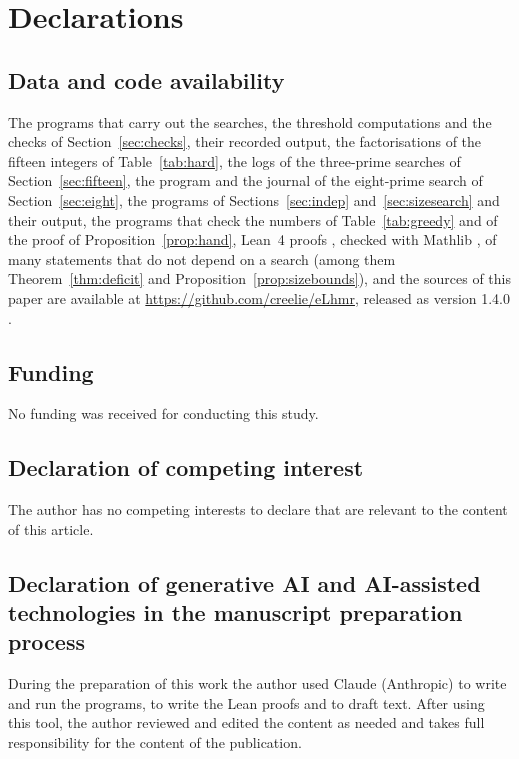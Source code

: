 \documentclass[11pt,reqno]{amsart}
\numberwithin{equation}{section}
\theoremstyle{plain}
\theoremstyle{definition}
\theoremstyle{remark}
\newcommand{\releaseline}{, released as version 1.4.0 \cite{Data}}
\begin{document}
\section*{Declarations}

\subsection*{Data and code availability}
The programs that carry out the searches, the threshold computations
and the checks of Section~\ref{sec:checks}, their recorded output, the
factorisations of the fifteen integers of Table~\ref{tab:hard}, the
logs of the three-prime searches of Section~\ref{sec:fifteen}, the
program and the journal of the eight-prime search of
Section~\ref{sec:eight}, the programs of Sections~\ref{sec:indep}
and~\ref{sec:sizesearch} and their output, the programs that check the
numbers of Table~\ref{tab:greedy} and of the proof of
Proposition~\ref{prop:hand}, Lean~4 proofs \cite{dMU21}, checked
with Mathlib \cite{Mathlib}, of many statements that do not depend on
a search (among them Theorem~\ref{thm:deficit} and
Proposition~\ref{prop:sizebounds}), and the sources of this paper are
available at
\url{https://github.com/creelie/eLhmr}\releaseline.

\subsection*{Funding}
No funding was received for conducting this study.

\subsection*{Declaration of competing interest}
The author has no competing interests to declare that are relevant to
the content of this article.

\subsection*{Declaration of generative AI and AI-assisted technologies in the manuscript preparation process}
During the preparation of this work the author used Claude (Anthropic)
to write and run the programs, to write the Lean proofs and to draft
text. After using this tool, the author reviewed and edited the content
as needed and takes full responsibility for the content of the
publication.
\end{document}
